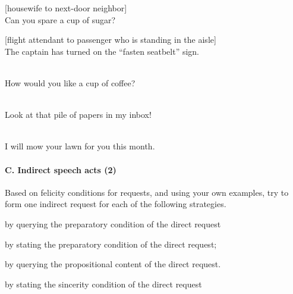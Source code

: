 {\ea 
{}[housewife to next-door neighbor]\\
Can you spare a cup of sugar?
\z


\ea
{[flight attendant to passenger who is standing in the aisle]}\\
The captain has turned on the “fasten seatbelt” sign.
\z


\\
How would you like a cup of coffee?
\z


\\
Look at that pile of papers in my inbox!
\z


\\
I will mow your lawn for you this month.
\z


\paragraph*{C. Indirect speech acts (2)}

Based on felicity conditions for requests, and using your own examples, try to form one indirect request for each of the following strategies.

\ea 
\ea  by querying the preparatory condition of the direct request\\

\ex by stating the preparatory condition of the direct request;

\ex by querying the propositional content of the direct request.

\ex by stating the sincerity condition of the direct request
\z
\z
}
